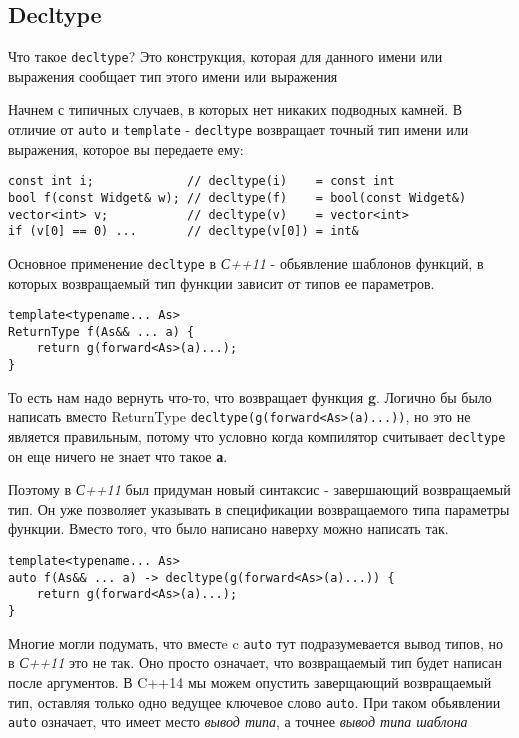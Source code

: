 	\subsection {Decltype}
		Что такое \texttt{decltype}? Это конструкция, которая для данного имени или выражения сообщает тип этого имени или выражения
		
		Начнем с типичных случаев, в которых нет никаких подводных камней. В отличие от \texttt{auto} и \texttt{template} - \texttt{decltype} возвращает точный тип имени или выражения, которое вы передаете ему:
		
\begin{verbatim}
const int i;             // decltype(i)    = const int
bool f(const Widget& w); // decltype(f)    = bool(const Widget&)
vector<int> v;           // decltype(v)    = vector<int>
if (v[0] == 0) ...       // decltype(v[0]) = int&
\end{verbatim}
		
		Основное применение \texttt{decltype} в \textit{С++11} - обьявление шаблонов функций, в которых возвращаемый тип функции зависит от типов ее параметров.
\begin{verbatim}		
template<typename... As>
ReturnType f(As&& ... a) {
	return g(forward<As>(a)...);
}
\end{verbatim}
		То есть нам надо вернуть что-то, что возвращает функция \textbf{g}. Логично бы было написать вместо ReturnType \texttt{decltype(g(forward<As>(a)...))}, но это не является правильным, потому что условно когда компилятор считывает \texttt{decltype} он еще ничего не знает что такое \textbf{а}.
		
		Поэтому в \textit{С++11} был придуман новый синтаксис - завершающий возвращаемый тип. Он уже позволяет указывать в спецификации возвращаемого типа параметры функции. Вместо того, что было написано наверху можно написать так.
		
\begin{verbatim}
template<typename... As>
auto f(As&& ... a) -> decltype(g(forward<As>(a)...)) {
	return g(forward<As>(a)...);
}
\end{verbatim}
		
		Многие могли подумать, что вместe c \texttt{auto} тут подразумевается вывод типов, но в \textit{С++11} это не так. Оно просто означает, что возвращаемый тип будет написан после аргументов. В C++14 мы можем опустить заверщающий возвращаемый тип, оставляя только одно ведущее ключевое слово \texttt{auto}. При таком обьявлении \texttt{auto} означает, что имеет место \textit{вывод типа}, а точнее \textit{вывод типа шаблона}
		
